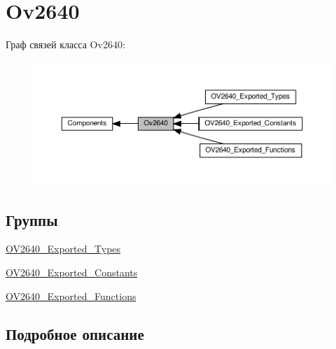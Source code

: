 \hypertarget{group__ov2640}{}\section{Ov2640}
\label{group__ov2640}
Граф связей класса Ov2640\+:
\nopagebreak
\begin{figure}[H]
\begin{center}
\leavevmode
\includegraphics[width=350pt]{group__ov2640}
\end{center}
\end{figure}
\subsection*{Группы}
\begin{DoxyCompactItemize}
\item 
\hyperlink{group___o_v2640___exported___types}{O\+V2640\+\_\+\+Exported\+\_\+\+Types}
\item 
\hyperlink{group___o_v2640___exported___constants}{O\+V2640\+\_\+\+Exported\+\_\+\+Constants}
\item 
\hyperlink{group___o_v2640___exported___functions}{O\+V2640\+\_\+\+Exported\+\_\+\+Functions}
\end{DoxyCompactItemize}


\subsection{Подробное описание}
